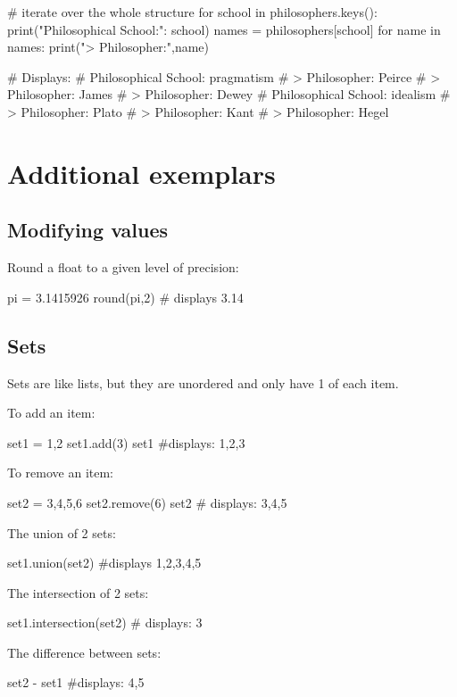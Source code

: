 \begin{pycode}
    # iterate over the whole structure
    for school in philosophers.keys():
        print("Philosophical School:": school)
        names = philosophers[school]
        for name in names:
            print("> Philosopher:",name)

    # Displays:
    # Philosophical School: pragmatism
    # > Philosopher: Peirce
    # > Philosopher: James
    # > Philosopher: Dewey
    # Philosophical School: idealism
    # > Philosopher: Plato
    # > Philosopher: Kant
    # > Philosopher: Hegel
\end{pycode}

\section{Additional exemplars}

\subsection{Modifying values}

Round a float to a given level of precision:

\begin{pycode}
    pi = 3.1415926
    round(pi,2) # displays 3.14
\end{pycode}

\subsection{Sets}

Sets are like lists, but they are unordered and only have 1 of each item.

To add an item:

\begin{pycode}
    set1 = {1,2}
    set1.add(3)
    set1 #displays: {1,2,3}
\end{pycode}

To remove an item:

\begin{pycode}
    set2 = {3,4,5,6}
    set2.remove(6)
    set2 # displays: {3,4,5}
\end{pycode}

The union of 2 sets:

\begin{pycode}
    set1.union(set2) #displays {1,2,3,4,5}
\end{pycode}

The intersection of 2 sets:

\begin{pycode}
    set1.intersection(set2) # displays: {3}
\end{pycode}

The difference between sets:

\begin{pycode}
    set2 - set1 #displays: {4,5}
\end{pycode}




